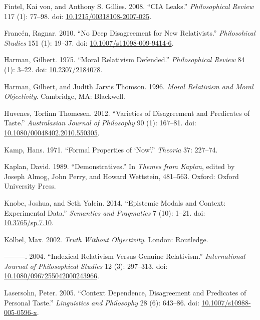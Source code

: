 \documentclass[
  10pt,
  letterpaper,
  DIV=11,
  numbers=noendperiod,
  twoside]{scrartcl}
\newlength{\cslhangindent}
\newenvironment{CSLReferences}[2] %
 {\begin{list}{}{%
  \setlength{\itemindent}{0pt}
  \setlength{\leftmargin}{0pt}
  \setlength{\parsep}{0pt}
  \ifodd #1
   \setlength{\leftmargin}{\cslhangindent}
   \setlength{\itemindent}{-1\cslhangindent}
  \fi
  \setlength{\itemsep}{#2\baselineskip}}}
 {\end{list}}
\begin{document}
\begin{CSLReferences}{1}{0}
Fintel, Kai von, and Anthony S. Gillies. 2008. {``CIA Leaks.''}
\emph{Philosophical Review} 117 (1): 77--98. doi:
\href{https://doi.org/10.1215/00318108-2007-025}{10.1215/00318108-2007-025}.

Francén, Ragnar. 2010. {``No Deep Disagreement for New Relativists.''}
\emph{Philosohical Studies} 151 (1): 19--37. doi:
\href{https://doi.org/10.1007/s11098-009-9414-6}{10.1007/s11098-009-9414-6}.

Harman, Gilbert. 1975. {``Moral Relativism Defended.''}
\emph{Philosophical Review} 84 (1): 3--22. doi:
\href{https://doi.org/10.2307/2184078}{10.2307/2184078}.

Harman, Gilbert, and Judith Jarvis Thomson. 1996. \emph{Moral Relativism
and Moral Objectivity}. Cambridge, MA: Blackwell.

Huvenes, Torfinn Thomesen. 2012. {``Varieties of Disagreement and
Predicates of Taste.''} \emph{Australasian Journal of Philosophy} 90
(1): 167--81. doi:
\href{https://doi.org/10.1080/00048402.2010.550305}{10.1080/00048402.2010.550305}.

Kamp, Hans. 1971. {``Formal Properties of {`Now'}.''} \emph{Theoria} 37:
227--74.

Kaplan, David. 1989. {``Demonstratives.''} In \emph{Themes from Kaplan},
edited by Joseph Almog, John Perry, and Howard Wettstein, 481--563.
Oxford: Oxford University Press.

Knobe, Joshua, and Seth Yalcin. 2014. {``Epistemic Modals and Context:
Experimental Data.''} \emph{Semantics and Pragmatics} 7 (10): 1--21.
doi: \href{https://doi.org/10.3765/sp.7.10}{10.3765/sp.7.10}.

Kölbel, Max. 2002. \emph{Truth Without Objectivity}. London: Routledge.

---------. 2004. {``Indexical Relativism Versus Genuine Relativism.''}
\emph{International Journal of Philosophical Studies} 12 (3): 297--313.
doi:
\href{https://doi.org/10.1080/0967255042000243966}{10.1080/0967255042000243966}.

Lasersohn, Peter. 2005. {``Context Dependence, Disagreement and
Predicates of Personal Taste.''} \emph{Linguistics and Philosophy} 28
(6): 643--86. doi:
\href{https://doi.org/10.1007/s10988-005-0596-x}{10.1007/s10988-005-0596-x}.


\end{CSLReferences}
\end{document}
